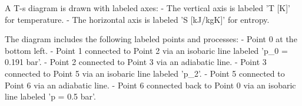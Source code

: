 A T-s diagram is drawn with labeled axes:  
- The vertical axis is labeled 'T [K]' for temperature.  
- The horizontal axis is labeled 'S [kJ/kgK]' for entropy.  

The diagram includes the following labeled points and processes:  
- Point 0 at the bottom left.  
- Point 1 connected to Point 2 via an isobaric line labeled 'p_0 = 0.191 bar'.  
- Point 2 connected to Point 3 via an adiabatic line.  
- Point 3 connected to Point 5 via an isobaric line labeled 'p_2'.  
- Point 5 connected to Point 6 via an adiabatic line.  
- Point 6 connected back to Point 0 via an isobaric line labeled 'p = 0.5 bar'.